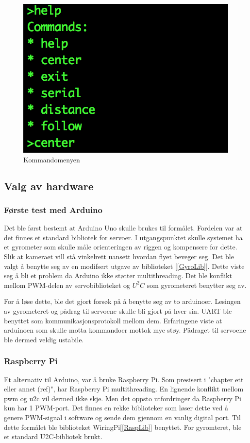 \begin{figure}[h!]
	\centering
	\includegraphics[scale=0.8]{img/command-menu.png}
	\caption{Kommandomenyen}
	\label{fig:commandmenu}
\end{figure}


\subsection{Valg av hardware}
\subsubsection{Første test med Arduino}
Det ble først bestemt at Arduino Uno skulle brukes til formålet. Fordelen var at det finnes et standard bibliotek for servoer. I utgangspunktet skulle systemet ha et gyrometer som skulle måle orienteringen av riggen og kompensere for dette. Slik at kameraet vill stå vinkelrett uansett hvordan flyet beveger seg. Det ble valgt å benytte seg av en modifsert utgave av biblioteket [\ref{GyroLib}]. Dette viste seg å bli et problem da Arduino ikke støtter multithreading. Det ble konflikt mellom PWM-delen av servobiblioteket og $U^2C$ som gyrometeret benytter seg av.

For å løse dette, ble det gjort forsøk på å benytte seg av to arduinoer. Lesingen av gyrometeret og pådrag til servoene skulle bli gjort på hver sin. UART ble benyttet som kommunikasjonsprotokoll mellom dem. Erfaringene viste at arduinoen som skulle motta kommandoer mottok mye støy. Pådraget til servoene ble dermed veldig ustabile. 

\subsubsection{Raspberry Pi}
Et alternativ til Arduino, var å bruke Raspberry Pi. Som presisert i "chapter ett eller annet (ref)", har Raspberry Pi multithreading. En lignende konflikt mellom pwm og u2c vil dermed ikke skje. Men det oppsto utfordringer da Raspberry Pi kun har 1 PWM-port. Det finnes en rekke biblioteker som løser dette ved å genere PWM-signal i software og sende dem gjennom en vanlig digital port. Til dette formålet ble biblioteket WiringPi[\ref{RaspLib}] benyttet. For gyromteret, ble et standard U2C-bibliotek brukt.


